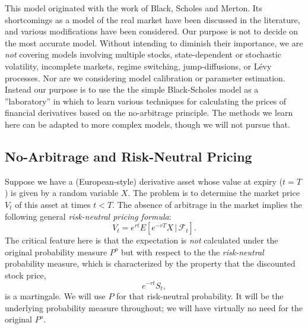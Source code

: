 This model originated with the work of Black, Scholes and Merton. Its shortcomings as a model of the real market have been discussed in the literature, and various modifications have been considered. Our purpose is not to decide on the most accurate model. Without intending to diminish their importance, we are \textit{not} covering models involving multiple stocks, state-dependent or stochastic volatility, incomplete markets, regime switching, jump-diffusions, or L\'evy processes. Nor are we considering model calibration or parameter estimation. Instead our purpose is to use the the simple Black-Scholes model as a ''laboratory'' in which to learn various techniques for calculating the prices of financial derivatives based on the no-arbitrage principle. The methods we learn here can be adapted to more complex models, though we will not pursue that.

\subsection{No-Arbitrage and Risk-Neutral Pricing}

Suppose we have a (European-style) derivative asset whose value at expiry ($t=T$) is given by a random variable $X$. The problem is to determine the market price $V_{t}$ of this asset at times $t<T$. The absence of arbitrage in the market implies the following general \textit{risk-neutral pricing formula}:
\begin{equation*}
V_{t}=e^{rt}E[e^{-rT}X\,|\,\mathcal{F}_{t}]. \tag{1.2}
\end{equation*}
The critical feature here is that the expectation is \textit{not} calculated under the original probability measure $P^{o}$ but with respect to the the \textit{risk-neutral} probability measure, which is characterized by the property that the discounted stock price,
\begin{equation*}
e^{-rt}S_{t},
\end{equation*}
is a martingale. We will use $P$ for that risk-neutral probability. It will be the underlying probability measure throughout; we will have virtually no need for the original $P^{o}$.

